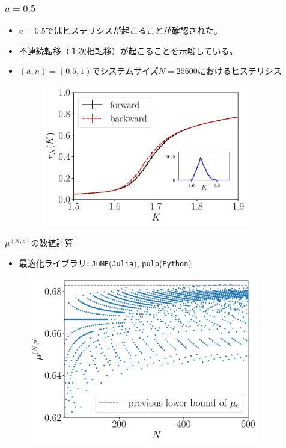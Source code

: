 \begin{frame}\frametitle{$a=0.5$}
  \begin{itemize}
    \item $a=0.5$ではヒステリシスが起こることが確認された。
    \item 不連続転移（１次相転移）が起こることを示唆している。
    \item $(a,n)=(0.5,1)$でシステムサイズ$N=25600$におけるヒステリシス
    \begin{figure}
      \includegraphics[width=9cm]{figs/hysteresis.pdf}
    \end{figure}
  \end{itemize}
\end{frame}

\begin{frame}{$\mu^{(N,p)}$の数値計算}
\begin{itemize}
    \item 最適化ライブラリ: \texttt{JuMP}(\texttt{Julia}), \texttt{pulp}(\texttt{Python})
\end{itemize}
\begin{figure}
    \centering
    \includegraphics[width=0.9\textwidth]{figs/max_connect.pdf}
\end{figure}
\end{frame}

